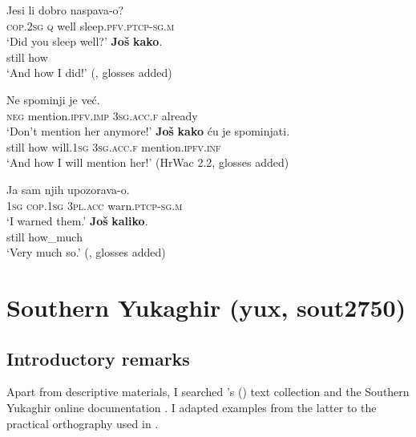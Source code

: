 \begin{exe}
	\ex\label{exappendixBCMSJosKako1}
	\begin{xlist}
		\gll Jesi li dobro naspava-o?\\
		\textsc{cop}.2\textsc{sg} \textsc{q} well sleep.\textsc{pfv}.\textsc{ptcp}-\textsc{sg}.\textsc{m}\\
		\glt \lq Did you sleep well?'
		 \gll \textbf{Još} \textbf{kako}.\\
		still how\\
		\glt \lq And how I did!' (\cite[72]{Prajnkovic2018}, glosses added)
	\end{xlist}

	\ex\label{exappendixBCMSJosKako2}
	\begin{xlist}
		 \gll Ne spominji je već.\\
		\textsc{neg} mention.\textsc{ipfv}.\textsc{imp} 3\textsc{sg}.\textsc{acc}.\textsc{f} already\\
		\glt \lq Don't mention her anymore!'
		 \gll \textbf{Još} \textbf{kako} ću je spominjati.\\
		still how will.1\textsc{sg} 3\textsc{sg}.\textsc{acc}.\textsc{f} mention.\textsc{ipfv}.\textsc{inf}\\
		\glt \lq And how I will mention her!' (HrWac 2.2, glosses added)
	\end{xlist}
	
	\ex\label{exappendixBCMSJosKaliko}
	\begin{xlist}
	\gll Ja sam njih upozorava-o.\\
	1\textsc{sg} \textsc{cop}.1\textsc{sg} 3\textsc{pl}.\textsc{acc} warn.\textsc{ptcp}-\textsc{sg}.\textsc{m}\\
	\glt \lq I warned them.'
	\gll \textbf{Još} \textbf{kaliko}.\\
	still how\_much\\
	\glt \lq Very much so.' (\cite[s.v. \textit{još}]{HJP}, glosses added)
	\end{xlist}
\end{exe}

\section{Southern Yukaghir (yux, sout2750)}

\subsection{Introductory remarks}
\begin{sloppypar}
Apart from descriptive materials, I searched \citeauthor{YukaghirTexts}'s (\citeyear{YukaghirTexts}) text collection and the Southern Yukaghir online documentation \parencite{NikolaevaMayer2004}. I adapted examples from the latter to the practical orthography used in \textcite{Maslova2003}.
\end{sloppypar}

